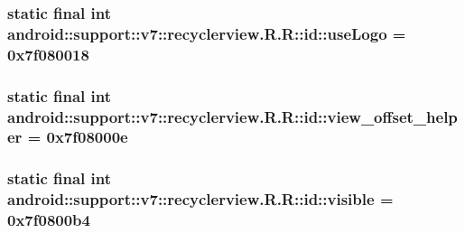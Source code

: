 \hypertarget{classandroid_1_1support_1_1v7_1_1recyclerview_1_1_r_1_1id_c9eddebbea1685a5f7e06aeaa6a5f120}{
\subsubsection[{useLogo}]{\setlength{\rightskip}{0pt plus 5cm}static final int android::support::v7::recyclerview.R.R::id::useLogo = 0x7f080018}}
\label{classandroid_1_1support_1_1v7_1_1recyclerview_1_1_r_1_1id_c9eddebbea1685a5f7e06aeaa6a5f120}


\hypertarget{classandroid_1_1support_1_1v7_1_1recyclerview_1_1_r_1_1id_908c767aedfc0214876dd88090204ab9}{
\subsubsection[{view\_\-offset\_\-helper}]{\setlength{\rightskip}{0pt plus 5cm}static final int android::support::v7::recyclerview.R.R::id::view\_\-offset\_\-helper = 0x7f08000e}}
\label{classandroid_1_1support_1_1v7_1_1recyclerview_1_1_r_1_1id_908c767aedfc0214876dd88090204ab9}


\hypertarget{classandroid_1_1support_1_1v7_1_1recyclerview_1_1_r_1_1id_54a5e5adc1010331ab4cee2a5a72f91d}{
\subsubsection[{visible}]{\setlength{\rightskip}{0pt plus 5cm}static final int android::support::v7::recyclerview.R.R::id::visible = 0x7f0800b4}}
\label{classandroid_1_1support_1_1v7_1_1recyclerview_1_1_r_1_1id_54a5e5adc1010331ab4cee2a5a72f91d}


